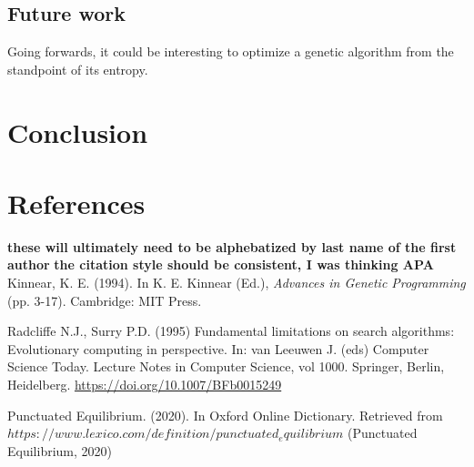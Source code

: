 \documentclass[11pt]{article}
\begin{document}
\subsection{Future work}
\label{sec:org0f04af1}
Going forwards, it could be interesting to optimize a genetic algorithm from the standpoint of its entropy.

\section{Conclusion}



\section{References}
\label{sec:org9dc046e}
\textbf{these will ultimately need to be alphebatized by last name of the first author} \textbf{the citation style should be consistent, I was thinking APA}
\doublespacing
Kinnear, K. E. (1994). In K. E. Kinnear (Ed.), \emph{Advances in Genetic Programming} (pp. 3-17). Cambridge: MIT Press.

Radcliffe N.J., Surry P.D. (1995) Fundamental limitations on search algorithms: Evolutionary computing in perspective.
In: van Leeuwen J. (eds) Computer Science Today. Lecture Notes in Computer Science, vol 1000. Springer, Berlin, Heidelberg.
\url{https://doi.org/10.1007/BFb0015249}

Punctuated Equilibrium. (2020). In Oxford Online Dictionary. Retrieved from 
$https://www.lexico.com/definition/punctuated_equilibrium$
(Punctuated Equilibrium, 2020)
\end{document}
